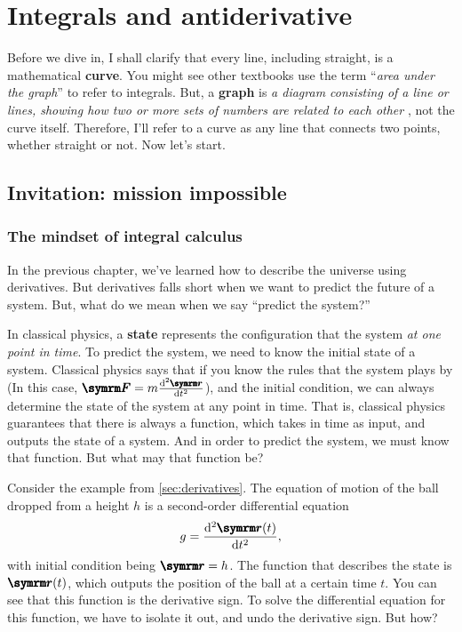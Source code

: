 \chapter{Integrals and antiderivative}
\label{sec:integrals}


Before we dive in, I shall clarify that every line, including straight, is a mathematical \textbf{curve}. You might see other textbooks use the term ``\emph{area under the graph}'' to refer to integrals. But, a \textbf{graph} is \textit{a diagram consisting of a line or lines, showing how two or more sets of numbers are related to each other} \cite{oxforddict}, not the curve itself. Therefore, I'll refer to a curve as any line that connects two points, whether straight or not. Now let's start.

\section{Invitation: mission impossible}

\subsection{The mindset of integral calculus}

In the previous chapter, we've learned how to describe the universe using derivatives. But derivatives falls short when we want to predict the future of a system. But, what do we mean when we say ``predict the system?''

In classical physics, a \textbf{state} represents the configuration that the system \emph{at one point in time}. To predict the system, we need to know the initial state of a system. Classical physics says that if you know the rules that the system plays by (In this case, $\vv{F} = m\odv[ord = 2]{\vv{r}}{t}$), and the initial condition, we can always determine the state of the system at any point in time. That is, classical physics guarantees that there is always a function, which takes in time as input, and outputs the state of a system. And in order to predict the system, we must know that function. But what may that function be?

Consider the example from \cref{sec:derivatives}. The equation of motion of the ball dropped from a height $h$ is a second-order differential equation
\begin{equation}
    g = \odv[ord = 2]{\vv{r}(t)}{t}, \label{eq:acceleration_from_gravity}
\end{equation}
with initial condition being $\vv{r} = h$. The function that describes the state is $\vv{r}(t)$, which outputs the position of the ball at a certain time $t$. You can see that this function is the derivative sign. To solve the differential equation for this function, we have to isolate it out, and undo the derivative sign. But how?


